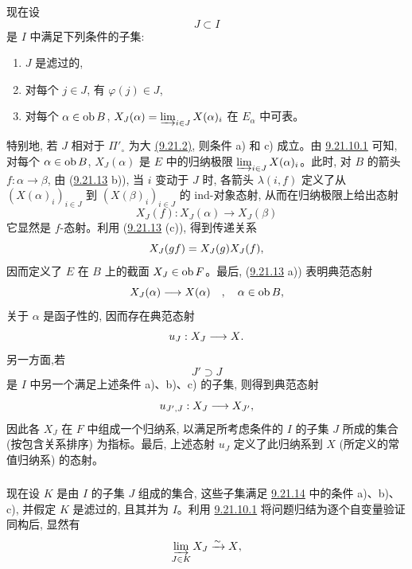 \setcounter{subsection}{21} \setcounter{subsubsection}{13}


\subsubsection{}
现在\pageoriginale 设
$$
J\subset I
$$
是 $I$ 中满足下列条件的子集:
\begin{enumerate}
\renewcommand{\theenumi}{\alph{enumi}}
\renewcommand{\labelenumi}{\theenumi)}
\item $J$ 是滤过的,

\item 对每个 $j\in J$, 有 $\varphi(j)\in J$,

\item 对每个 $\alpha\in\operatorname{ob} B$, $X_J(\alpha)=\varinjlim_{i\in J}X(\alpha)_i$ 在 $E_\alpha$ 中可表。
\end{enumerate}
特别地, 若 $J$ 相对于 $\Pi'_\circ$ 为大 \hyperlink{sga4.exp.I.equation.9.21.2}{(9.21.2)}, 则条件 a) 和 c) 成立。由 \hyperref[I.cor9.21.10.1]{9.21.10.1} 可知, 对每个 $\alpha\in\operatorname{ob} B$, $X_J(\alpha)$ 是 $E$ 中的归纳极限 $\varinjlim_{i\in J}X(\alpha)_i$。此时, 对 $B$ 的箭头 $f:\alpha\rightarrow\beta$, 由 (\hyperref[I.lem9.21.13]{9.21.13} b)), 当 $i$ 变动于 $J$ 时, 各箭头 $\lambda(i,f)$ 定义了从 $(X(\alpha)_i)_{i\in J}$ 到 $(X(\beta)_i)_{i\in J}$ 的 ind-对象态射, 从而在归纳极限上给出态射
$$
X_J(f):X_J(\alpha)\rightarrow X_J(\beta)
$$
它显然是 $f$-态射。利用 (\hyperref[I.lem9.21.13]{9.21.13} (c)), 得到传递关系
$$
X_J(gf)=X_J(g)X_J(f){},
$$
因而定义了 $E$ 在 $B$ 上的截面 $X_J\in\operatorname{ob} F$。最后, (\hyperref[I.lem9.21.13]{9.21.13} a)) 表明典范态射
$$
X_J(\alpha)\longrightarrow X(\alpha)\quad,\quad \alpha\in \operatorname{ob} B{},
$$
关于 $\alpha$ 是函子性的, 因而存在典范态射
$$
u_J:X_J\longrightarrow X{}.
$$
另一方面,\pageoriginale 若
$$
J'\supset J
$$
是 $I$ 中另一个满足上述条件 a)、b)、c) 的子集, 则得到典范态射
$$
u_{J',J}:X_J\longrightarrow X_{J'}{},
$$
因此各 $X_J$ 在 $F$ 中组成一个归纳系, 以满足所考虑条件的 $I$ 的子集 $J$ 所成的集合 (按包含关系排序) 为指标。最后, 上述态射 $u_J$ 定义了此归纳系到 $X$ (所定义的常值归纳系) 的态射。

\setcounter{subsection}{21} \setcounter{subsubsection}{14}
\subsubsection{}
现在设 $K$ 是由 $I$ 的子集 $J$ 组成的集合, 这些子集满足 \hyperref[I.sec9.21.14]{9.21.14} 中的条件 a)、b)、c), 并假定 $K$ 是滤过的, 且其并为 $I$。利用 \hyperref[I.cor9.21.10.1]{9.21.10.1} 将问题归结为逐个自变量验证同构后, 显然有
$$
\varinjlim_{J\in K}X_J\xrightarrow{\sim}X{},
$$

